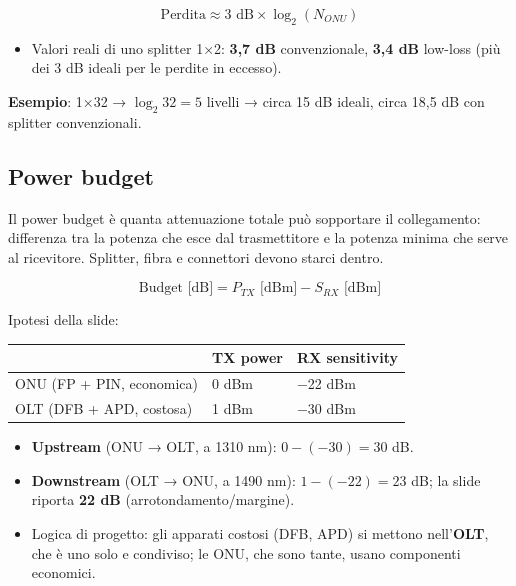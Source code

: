 \[
\text{Perdita} \approx 3 \text{ dB} \times \log_2(N_{ONU})
\]

\begin{itemize}
\tightlist
\item
  Valori reali di uno splitter 1×2: \textbf{3,7 dB} convenzionale, \textbf{3,4 dB} low-loss (più dei 3 dB ideali per le perdite in eccesso).
\end{itemize}

\textbf{Esempio}: 1×32 → \(\log_2 32 = 5\) livelli → circa 15 dB ideali, circa 18,5 dB con splitter convenzionali.

\subsection{Power budget}

\begin{inbreve}

Il power budget è quanta attenuazione totale può sopportare il collegamento: differenza tra la potenza che esce dal trasmettitore e la potenza minima che serve al ricevitore. Splitter, fibra e connettori devono starci dentro.

\end{inbreve}

\[
\text{Budget [dB]} = P_{TX} \text{ [dBm]} - S_{RX} \text{ [dBm]}
\]

Ipotesi della slide:

\begin{longtable}[]{@{}lll@{}}
\toprule\noalign{}
& TX power & RX sensitivity \\
\midrule\noalign{}
\endhead
\bottomrule\noalign{}
\endlastfoot
ONU (FP + PIN, economica) & 0 dBm & −22 dBm \\
OLT (DFB + APD, costosa) & 1 dBm & −30 dBm \\
\end{longtable}

\begin{itemize}
\tightlist
\item
  \textbf{Upstream} (ONU → OLT, a 1310 nm): \(0 - (-30) = 30\) dB.
\item
  \textbf{Downstream} (OLT → ONU, a 1490 nm): \(1 - (-22) = 23\) dB; la slide riporta \textbf{22 dB} (arrotondamento/margine).
\item
  Logica di progetto: gli apparati costosi (DFB, APD) si mettono nell'\textbf{OLT}, che è uno solo e condiviso; le ONU, che sono tante, usano componenti economici.
\end{itemize}


